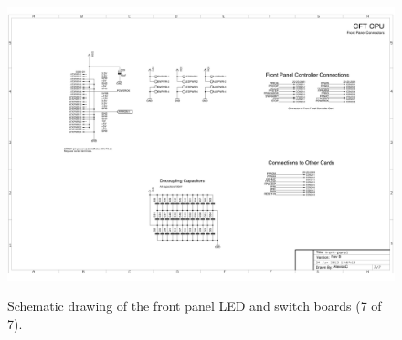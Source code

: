 \documentclass[11pt,a4paper,twocolumns]{article}
\begin{document}
\begin{figure}
\centering
\includegraphics[width=0.95\textheight,angle=90]{figs/front-panel-7.jpg}\\
\caption{\label{fig-schematic-front-panel-7}Schematic drawing of the front panel LED and switch boards (7 of 7).}
\end{figure}
\end{document}
